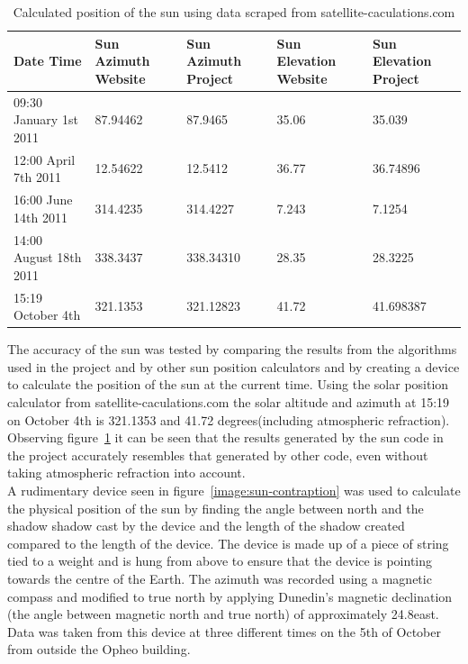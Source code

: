 \documentclass[12pt]{report}
\begin{document}
\begin{table}
\begin{tabular}{ | l | l | l | l  | l |}
\hline
Date Time & Sun Azimuth Website & Sun Azimuth Project & Sun Elevation Website & Sun Elevation Project\\ \hline
09:30 January 1st 2011 & 87.94462 & 87.9465 & 35.06 & 35.039\\ \hline
12:00 April 7th 2011 & 12.54622 & 12.5412 & 36.77 & 36.74896\\ \hline
16:00 June 14th 2011 & 314.4235 & 314.4227 & 7.243 & 7.1254\\ \hline
14:00 August 18th 2011 & 338.3437 & 338.34310 & 28.35 & 28.3225\\ \hline
15:19 October 4th & 321.1353 & 321.12823 & 41.72 & 41.698387\\ \hline
\end{tabular}
\caption{Calculated position of the sun using data scraped from satellite-caculations.com\cite{solarpos}}
\label{table:websun}
\end{table}


The accuracy of the sun was tested by comparing the results from the algorithms used in the project and by other sun position calculators and by creating a device to calculate the position of the sun at the current time. Using the solar position calculator from satellite-caculations.com\cite{solarpos} the solar altitude and azimuth at 15:19 on October 4th is 321.1353 and 41.72 degrees(including atmospheric refraction). Observing figure~\ref{table:websun} it can be seen that the results generated by the sun code in the project accurately resembles that generated by other code, even without taking atmospheric refraction into account.\\

A rudimentary device seen in figure~\ref{image:sun-contraption} was used to calculate the physical position of the sun by finding the angle between north and the shadow shadow cast by the device and the length of the shadow created compared to the length of the device. The device is made up of a piece of string tied to a weight and is hung from above to ensure that the device is pointing towards the centre of the Earth. The azimuth was recorded using a magnetic compass and modified to true north by applying Dunedin's magnetic declination (the angle between magnetic north and true north) of approximately 24.8\degree east. Data was taken from this device at three different times on the 5th of October from outside the Opheo building.\\
\end{document}
